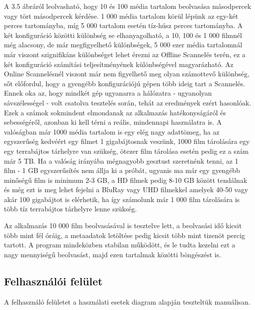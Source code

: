 A 3.5 ábráról leolvasható, hogy 10 és 100 média tartalom beolvasása másodpercek vagy tört másodpercek kérdése. 1 000 média tartalom körül lépünk az egy-két perces tartományba, míg 5 000 tartalom esetén tíz-húsz perces tartományba. A két konfiguráció közötti különbség se elhanyagolható, a 10, 100 és 1 000 filmnél még alacsony, de már megfigyelhető különbségek, 5 000 ezer média tartalomnál már viszont szignifikáns különbséget lehet érezni az Offline Scannelés terén, ez a két konfiguráció számítási teljesítményének különbségével magyarázható. Az Online Scannelésnél viszont már nem figyelhető meg olyan számottevő különbség, sőt előfordul, hogy a gyengébb konfigurációjú gépen több ideig tart a Scannelés. Ennek oka az, hogy mindkét gép ugyanarra a hálózatra - ugyanolyan sávszélességel - volt csatolva tesztelés során, tehát az eredmények ezért hasonlóak.
Ezek a számok sokmindent elmondanak az alkalmazás hatékonyságáról és sebességéről, azonban ki kell térni a reális, mindennapi használatra is. A valóságban már 1000 média tartalom is egy elég nagy adattömeg, ha az egyszerűség kedvéért egy filmet 1 gigabájtosnak veszünk, 1000 film tárolására egy egy terrabájtos tárhelyre van szükség, ötezer film tárolása esetén pedig ez a szám már 5 TB. Ha a valóság irányába mégnagyobb gesztust szeretnénk tenni, az 1 film - 1 GB egyszerűsítés nem állja ki a próbát, ugyanis ma már egy gyengébb minőségű film is minimum 2-3 GB, a HD filmek pedig 8-10 GB között tendálnak és még ezt is meg lehet fejelni a BluRay vagy UHD filmekkel amelyek 40-50 vagy akár 100 gigabájtot is elérhetik, ha így számolunk már 1 000 film tárolására is több tíz terrabájtos tárhelyre lenne szükség.

Az alkalmazás 10 000 film beolvasásával is tesztelve lett, a beolvasási idő kicsit több mint fél óráig, a metaadatok letöltése pedig kicsit több mint tizenöt percig tartott. A program mindeközben stabilan működött, és le tudta kezelni ezt a nagy mennyiségű beolvasást, majd ezen tartalmak közötti böngészést is.

\subsection{Felhasználói felület}
A felhasználó felületet a használati esetek diagram alapján teszteltük manuálisan.

